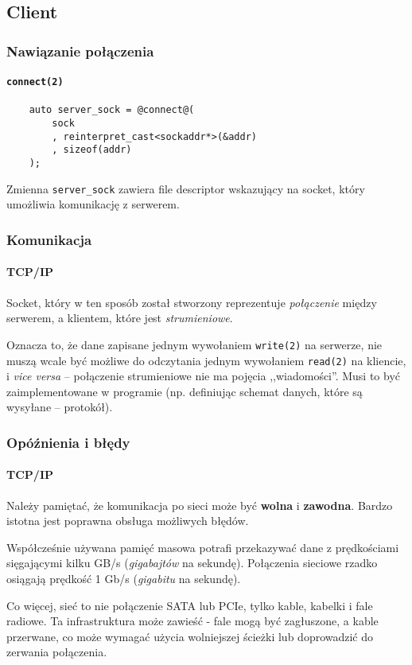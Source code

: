\documentclass[aspectratio=169]{beamer}
\begin{document}
\subsection{Client}

\begin{frame}[fragile]
    \frametitle{Nawiązanie połączenia}
    \framesubtitle{\texttt{connect(2)}}

    {\footnotesize
    \begin{lstlisting}
    auto server_sock = @connect@(
        sock
        , reinterpret_cast<sockaddr*>(&addr)
        , sizeof(addr)
    );
    \end{lstlisting}}

    Zmienna \texttt{server\_sock} zawiera file descriptor wskazujący na socket,
    który umożliwia komunikację z serwerem.
\end{frame}

\begin{frame}
    \frametitle{Komunikacja}
    \framesubtitle{TCP/IP}

    Socket, który w ten sposób został stworzony reprezentuje \emph{połączenie}
    między serwerem, a klientem, które jest \emph{strumieniowe}.

    Oznacza to, że dane zapisane jednym wywołaniem \texttt{write(2)} na
    serwerze, nie muszą wcale być możliwe do odczytania jednym wywołaniem
    \texttt{read(2)} na kliencie, i \textit{vice versa} -- połączenie
    strumieniowe nie ma pojęcia ,,wiadomości''. Musi to być zaimplementowane w
    programie (np. definiując schemat danych, które są wysyłane -- protokół).
\end{frame}

\begin{frame}
    \frametitle{Opóźnienia i błędy}
    \framesubtitle{TCP/IP}

    Należy pamiętać, że komunikacja po sieci może być \textbf{wolna} i
    \textbf{zawodna}. Bardzo istotna jest poprawna obsługa możliwych błędów.

    \vspace{1em}

    Współcześnie używana pamięć masowa potrafi przekazywać dane z prędkościami
    sięgającymi kilku GB/s (\emph{gigabajtów} na sekundę). Połączenia sieciowe
    rzadko osiągają prędkość 1 Gb/s (\emph{gigabitu} na sekundę).

    \vspace{1em}

    Co więcej, sieć to nie połączenie SATA lub PCIe, tylko kable, kabelki i fale
    radiowe. Ta infrastruktura może zawieść - fale mogą być zagłuszone, a kable
    przerwane, co może wymagać użycia wolniejszej ścieżki lub doprowadzić do
    zerwania połączenia.
\end{frame}
\end{document}
